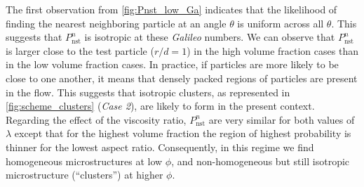 The first observation from \ref{fig:Pnst_low_Ga} indicates that the likelihood of finding the nearest neighboring particle at an angle $\theta$ is uniform across all $\theta$.
This suggests that $P_\text{nst}^n$ is isotropic at these \textit{Galileo} numbers. We can observe that $P_\text{nst}^n$ is larger close to the test particle ($r/d = 1$) in the high volume fraction cases than in the low volume fraction cases.
In practice, if particles are more likely to be close to one another, it means that densely packed regions of particles are present in the flow.
This suggests that isotropic clusters, as represented in \ref{fig:scheme_clusters} (\textit{Case 2}), are likely to form in the present context. 
Regarding the effect of the viscosity ratio, $P_\text{nst}^n$ are very similar for both values of $\lambda$ except that for the highest volume fraction the region of highest probability is thinner for the lowest aspect ratio. 
Consequently, in this regime we find homogeneous microstructures at low $\phi$, and non-homogeneous but still isotropic microstructure (``clusters'') at higher $\phi$. 


